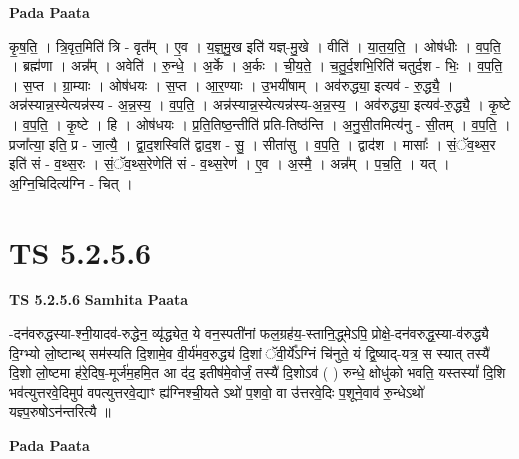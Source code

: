 \documentclass[17pt]{extarticle}
\begin{document}
\textbf{Pada Paata} \newline

कृ॒ष॒ति॒ । त्रि॒वृत॒मिति॑ त्रि - वृत᳚म् । ए॒व । य॒ज्ञ्॒मु॒ख इति॑ यज्ञ्-मु॒खे । वीति॑ । या॒त॒य॒ति॒ । ओष॑धीः । व॒प॒ति॒ । ब्रह्म॑णा । अन्न᳚म् । अवेति॑ । रु॒न्धे॒ । अ॒र्के । अ॒र्कः । ची॒य॒ते॒ । च॒तु॒र्द॒शभि॒रिति॑ चतुर्द॒श - भिः॒ । व॒प॒ति॒ । स॒प्त । ग्रा॒म्याः । ओष॑धयः । स॒प्त । आ॒र॒ण्याः । उ॒भयी॑षाम् । अव॑रुद्ध्या॒ इत्यव॑ - रु॒द्ध्यै॒ । अन्न॑स्यान्न॒स्येत्यन्न॑स्य - अ॒न्न॒स्य॒ । व॒प॒ति॒ । अन्न॑स्यान्न॒स्येत्यन्न॑स्य-अ॒न्न॒स्य॒ । अव॑रुद्ध्या॒ इत्यव॑-रु॒द्ध्यै॒ । कृ॒ष्टे । व॒प॒ति॒ । कृ॒ष्टे । हि । ओष॑धयः । प्र॒ति॒तिष्ठ॒न्तीति॑ प्रति-तिष्ठ॑न्ति । अ॒नु॒सी॒तमित्य॑नु - सी॒तम् । व॒प॒ति॒ । प्रजा᳚त्या॒ इति॒ प्र - जा॒त्यै॒ । द्वा॒द॒शस्विति॑ द्वाद॒श - सु॒ । सीता॑सु । व॒प॒ति॒ । द्वाद॑श । मासाः᳚ । सं॒ॅव॒थ्स॒र इति॑ सं - व॒थ्स॒रः । सं॒ॅव॒थ्स॒रेणेति॑ सं - व॒थ्स॒रेण॑ । ए॒व । अ॒स्मै॒ । अन्न᳚म् । प॒च॒ति॒ । यत् । अ॒ग्नि॒चिदित्य॑ग्नि - चित् ।  \newline





\section{ TS 5.2.5.6 }

\textbf{TS 5.2.5.6 } \newline
\textbf{Samhita Paata} \newline

-दन॑वरुद्धस्या-श्नी॒यादव॑-रुद्धेन॒ व्यृ॑द्ध्येत॒ ये वन॒स्पती॑नां फल॒ग्रह॑य॒-स्तानि॒द्ध्मेऽपि॒ प्रोक्षे॒-दन॑वरुद्ध॒स्या-व॑रुद्ध्यै दि॒ग्भ्यो लो॒ष्टान्थ् सम॑स्यति दि॒शामे॒व वी॒र्य॑मव॒रुद्ध्य॑ दि॒शां ॅवी॒र्ये᳚ऽग्निं चि॑नुते॒ यं द्वि॒ष्याद्-यत्र॒ स स्यात् तस्यै॑ दि॒शो लो॒ष्टमा ह॑रे॒दिष॒-मूर्ज॑म॒हमि॒त आ द॑द॒ इतीष॑मे॒वोर्जं॒ तस्यै॑ दि॒शोऽव॑ ( ) रुन्धे॒ क्षोधु॑को भवति॒ यस्तस्यां᳚ दि॒शि भव॑त्युत्तरवे॒दिमुप॑ वपत्युत्तरवे॒द्याꣳ ह्य॑ग्निश्ची॒यते ऽथो॑ प॒शवो॒ वा उ॑त्तरवे॒दिः प॒शूने॒वाव॑ रु॒न्धेऽथो॑ यज्ञ्प॒रुषोऽन॑न्तरित्यै ॥ \newline

\textbf{Pada Paata} \newline
\end{document}
